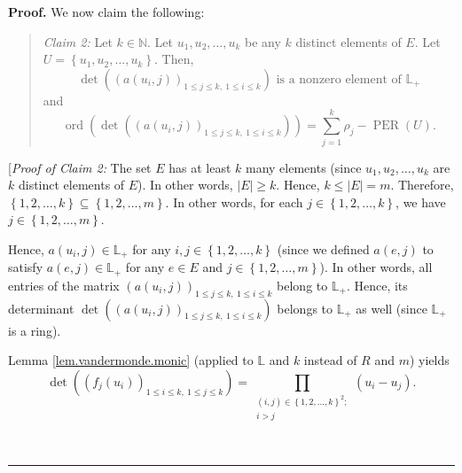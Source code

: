 \documentclass[numbers=enddot,12pt,final,onecolumn,notitlepage]{scrartcl}%
\theoremstyle{definition}
\newenvironment{statement}{\begin{quote}}{\end{quote}}
\newenvironment{proof}[1][Proof]{\noindent\textbf{#1.} }{\ \rule{0.5em}{0.5em}}
\let\sumnonlimits\sum
\let\prodnonlimits\prod
\renewcommand{\sum}{\sumnonlimits\limits}
\renewcommand{\prod}{\prodnonlimits\limits}
\renewcommand{\leq}{\leqslant}
\renewcommand{\geq}{\geqslant}
\theoremstyle{plainsl}
\begin{document}
\begin{proof}
We now claim the following:

\begin{statement}
\textit{Claim 2:} Let $k\in\mathbb{N}$. Let $u_{1},u_{2},\ldots,u_{k}$ be any
$k$ distinct elements of $E$. Let $U=\left\{  u_{1},u_{2},\ldots
,u_{k}\right\}  $. Then,
\begin{equation}
\det\left(  \left(  a\left(  u_{i},j\right)  \right)  _{1\leq j\leq k,\ 1\leq
i\leq k}\right)  \text{ is a nonzero element of }\mathbb{L}_{+}
\label{pf.thm.poly-ut-greed.c2.1}%
\end{equation}
and%
\begin{equation}
\operatorname*{ord}\left(  \det\left(  \left(  a\left(  u_{i},j\right)
\right)  _{1\leq j\leq k,\ 1\leq i\leq k}\right)  \right)  =\sum_{j=1}^{k}%
\rho_{j}-\operatorname*{PER}\left(  U\right)  .
\label{pf.thm.poly-ut-greed.c2.2}%
\end{equation}

\end{statement}

[\textit{Proof of Claim 2:} The set $E$ has at least $k$ many elements (since
$u_{1},u_{2},\ldots,u_{k}$ are $k$ distinct elements of $E$). In other words,
$\left\vert E\right\vert \geq k$. Hence, $k\leq\left\vert E\right\vert =m$.
Therefore, $\left\{  1,2,\ldots,k\right\}  \subseteq\left\{  1,2,\ldots
,m\right\}  $. In other words, for each $j\in\left\{  1,2,\ldots,k\right\}  $,
we have $j\in\left\{  1,2,\ldots,m\right\}  $.

Hence, $a\left(  u_{i},j\right)  \in\mathbb{L}_{+}$ for any $i,j\in\left\{
1,2,\ldots,k\right\}  $ (since we defined $a\left(  e,j\right)  $ to satisfy
$a\left(  e,j\right)  \in\mathbb{L}_{+}$ for any $e\in E$ and $j\in\left\{
1,2,\ldots,m\right\}  $). In other words, all entries of the matrix $\left(
a\left(  u_{i},j\right)  \right)  _{1\leq j\leq k,\ 1\leq i\leq k}$ belong to
$\mathbb{L}_{+}$. Hence, its determinant $\det\left(  \left(  a\left(
u_{i},j\right)  \right)  _{1\leq j\leq k,\ 1\leq i\leq k}\right)  $ belongs to
$\mathbb{L}_{+}$ as well (since $\mathbb{L}_{+}$ is a ring).

Lemma \ref{lem.vandermonde.monic} (applied to $\mathbb{L}$ and $k$ instead of
$R$ and $m$) yields%
\begin{equation}
\det\left(  \left(  f_{j}\left(  u_{i}\right)  \right)  _{1\leq i\leq
k,\ 1\leq j\leq k}\right)  =\prod_{\substack{\left(  i,j\right)  \in\left\{
1,2,\ldots,k\right\}  ^{2};\\i>j}}\left(  u_{i}-u_{j}\right)  .
\label{pf.thm.poly-ut-greed.vand}%
\end{equation}



\end{proof}
\end{document}
